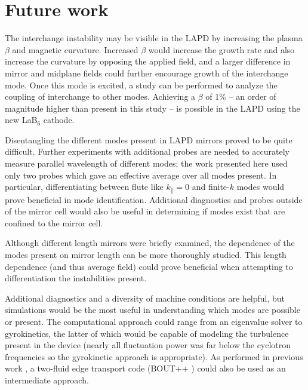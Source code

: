 
\section{Future work}

The interchange instability may be visible in the LAPD by increasing the plasma $\beta$ and magnetic curvature. Increased $\beta$ would increase the growth rate and also increase the curvature by opposing the applied field, and a larger difference in mirror and midplane fields could further encourage growth of the interchange mode. Once this mode is excited, a study can be performed to analyze the coupling of interchange to other modes. Achieving a $\beta$ of 1\% -- an order of magnitude higher than present in this study -- is possible in the LAPD using the new LaB$_6$ cathode. 

Disentangling the different modes present in LAPD mirrors proved to be quite difficult. Further experiments with additional probes are needed to accurately measure parallel wavelength of different modes; the work presented here used only two probes which gave an effective average over all modes present. In particular, differentiating between flute like $k_\parallel=0$ and finite-$k$ modes would prove beneficial in mode identification. Additional diagnostics and probes outside of the mirror cell would also be useful in determining if modes exist that are confined to the mirror cell. 

Although different length mirrors were briefly examined, the dependence of the modes present on mirror length can be more thoroughly studied. This length dependence (and thus average field) could prove beneficial when attempting to differentiation the instabilities present. 

Additional diagnostics and a diversity of machine conditions are helpful, but simulations would be the most useful in understanding which modes are possible or present. The computational approach could range from an eigenvalue solver to gyrokinetics, the latter of which would be capable of modeling the turbulence present in the device (nearly all fluctuation power was far below the cyclotron frequencies so the gyrokinetic approach is appropriate). As performed in previous work \cite{Friedman_2013}, a two-fluid edge transport code (BOUT++ \cite{dudson_bout_2009}) could also be used as an intermediate approach. 

